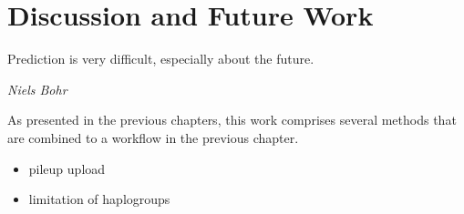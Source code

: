 \chapter{Discussion and Future Work}
\label{outlook}
\epigraph{Prediction is very difficult, especially about the future.}{\textit{Niels Bohr}}

As presented in the previous chapters, this work comprises several methods that are combined to a workflow in the previous chapter. 
\begin{itemize}
\item pileup upload
\item limitation of haplogroups
\end{itemize}
